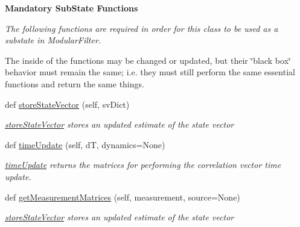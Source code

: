 \begin{Indent}{\bf Mandatory Sub\+State Functions}\par
{\em The following functions are required in order for this class to be used as a substate in Modular\+Filter.

The inside of the functions may be changed or updated, but their \char`\"{}black box\char`\"{} behavior must remain the same; i.\+e. they must still perform the same essential functions and return the same things. }\begin{DoxyCompactItemize}
\item 
def \hyperlink{classSignalCorrelationSubstate_1_1CorrelationFilter_a94b5211aa159578344974b52f3b9f92e}{store\+State\+Vector} (self, sv\+Dict)
\begin{DoxyCompactList}\small\item\em \hyperlink{classSignalCorrelationSubstate_1_1CorrelationFilter_a94b5211aa159578344974b52f3b9f92e}{store\+State\+Vector} stores an updated estimate of the state vector \end{DoxyCompactList}\item 
def \hyperlink{classSignalCorrelationSubstate_1_1CorrelationFilter_a07a8c37a30c3d0a057049e0ff2eac67f}{time\+Update} (self, dT, dynamics=None)
\begin{DoxyCompactList}\small\item\em \hyperlink{classSignalCorrelationSubstate_1_1CorrelationFilter_a07a8c37a30c3d0a057049e0ff2eac67f}{time\+Update} returns the matrices for performing the correlation vector time update. \end{DoxyCompactList}\item 
def \hyperlink{classSignalCorrelationSubstate_1_1CorrelationFilter_ae7338456be781e322eba5bce4e41199f}{get\+Measurement\+Matrices} (self, measurement, source=None)
\begin{DoxyCompactList}\small\item\em \hyperlink{classSignalCorrelationSubstate_1_1CorrelationFilter_a94b5211aa159578344974b52f3b9f92e}{store\+State\+Vector} stores an updated estimate of the state vector \end{DoxyCompactList}\end{DoxyCompactItemize}
\end{Indent}
